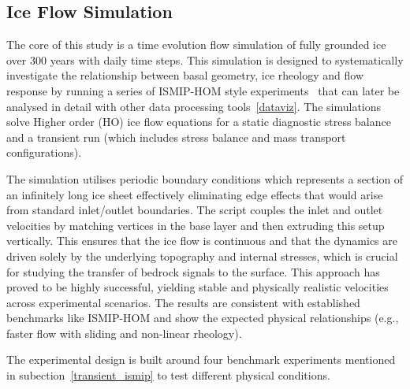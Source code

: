 \subsection{Ice Flow Simulation}
The core of this study is a time evolution flow simulation of fully grounded ice over 300 years with daily time steps. This simulation is designed to systematically investigate the relationship between basal geometry, ice rheology and flow response by running a series of ISMIP-HOM style experiments~\cite{Pattyn_2008} that can later be analysed in detail with other data processing tools~\ref{dataviz}. The simulations solve Higher order (HO) ice flow equations for a static diagnostic stress balance and a transient run (which includes stress balance and mass transport configurations).

The simulation utilises periodic boundary conditions which represents a section of an infinitely long ice sheet effectively eliminating edge effects that would arise from standard inlet/outlet boundaries. The script couples the inlet and outlet velocities by matching vertices in the base layer and then extruding this setup vertically. This ensures that the ice flow is continuous and that the dynamics are driven solely by the underlying topography and internal stresses, which is crucial for studying the transfer of bedrock signals to the surface.
This approach has proved to be highly successful, yielding stable and physically realistic velocities across experimental scenarios. The results are consistent with established benchmarks like ISMIP-HOM and show the expected physical relationships (e.g., faster flow with sliding and non-linear rheology).

The experimental design is built around four benchmark experiments mentioned in subection~\ref{transient_ismip} to test different physical conditions.









